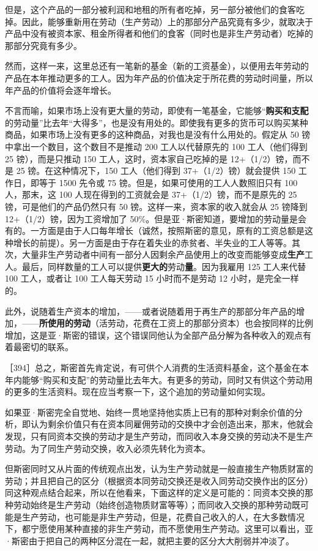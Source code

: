 但是，这个产品的一部分被利润和地租的所有者吃掉，另一部分被他们的食客吃掉。因此，能够重新用在劳动（生产劳动）上的那部分产品究竟有多少，就取决于产品中没有被资本家、租金所得者和他们的食客（同时也是非生产劳动者）吃掉的那部分究竟有多少。

然而，这样一来，这里总还有一笔新的基金（新的工资基金），以便用去年劳动的产品在本年推动更多的工人。因为年产品的价值决定于所花费的劳动时间量，所以年产品的价值将会逐年增长。

不言而喻，如果市场上没有更大量的劳动，即使有一笔基金，它能够“\textbf{购买和支配}的劳动量”比去年“大得多”，也是没有用处的。即使我有更多的货币可以购买某种商品，如果市场上没有更多的这种商品，对我也是没有什么用处的。假定从 50 镑中拿出一个数目，这个数目不是推动 200 工人以代替原先的 100 工人（他们得到 25 镑），而是只推动 150 工人，这时，资本家自己吃掉的是 12+（1/2）镑，而不是 25 镑。在这种情况下，150 工人（他们得到 37+（1/2）镑）就会提供 150 工作日，即等于 1500 先令或 75 镑。但是，如果可使用的工人人数照旧只有 100 人，那末，这 100 人现在得到的工资就会是 37+（1/2）镑，而不是原先的 25 镑，可是他们的产品仍然只有 50 镑。这样一来，资本家的收入就会从 25 镑降到 12+（1/2）镑，因为工资增加了 50\%。但是亚·斯密知道，要增加的劳动量是会有的。一方面是由于人口每年增长（诚然，按照斯密的意见，原有的工资总额是这种增长的前提）。另一方面是由于存在着失业的赤贫者、半失业的工人等等。其次，大量非生产劳动者中间有一部分人因剩余产品使用上的改变而能够变成\textbf{生产}工人。最后，同样数量的工人可以提供\textbf{更大的}劳动\textbf{量}。因为我雇用 125 工人来代替 100 工人，或者让 100 工人每天劳动 15 小时而不是劳动 12 小时，是完全一样的。

此外，说随着生产资本的增加，——或者说随着用于再生产的那部分年产品的增加，——\textbf{所使用的劳动}（活劳动，花费在工资上的那部分资本）也会按同样的比例增加，这是亚·斯密的错误，这个错误同他认为全部产品分解为各种收入的观点有着最密切的联系。

［394］总之，斯密首先肯定说，有可供个人消费的生活资料基金，这个基金在本年内能够“购买和支配”的劳动量比去年大。有更多的劳动，同时又有供这个劳动用的更多的生活资料。现在应当考察一下，这个追加的劳动量如何实现。\fontbox{\}~}

如果亚·斯密完全自觉地、始终一贯地坚持他实质上已有的那种对剩余价值的分析，即认为剩余价值只有在资本同雇佣劳动的交换中才会创造出来，那末，他就会发现，只有同资本交换的劳动才是生产劳动，而同收入本身交换的劳动决不是生产劳动。为了同生产劳动交换，收入必须先转化为资本。

但斯密同时又从片面的传统观点出发，认为生产劳动就是一般直接生产物质财富的劳动；并且把自己的区分（根据资本同劳动交换还是收入同劳动交换作出的区分）同这种观点结合起来，所以在他看来，下面这样的定义是可能的：同资本交换的那种劳动始终是生产劳动（始终创造物质财富等等）；而同收入交换的那种劳动既可能是生产劳动，也可能是非生产劳动，但是，花费自己收入的人，在大多数情况下，都宁愿使用某种直接的非生产劳动，而不愿使用生产劳动。这里可以看出，亚·斯密由于把自己的两种区分混在一起，就把主要的区分大大削弱并冲淡了。

